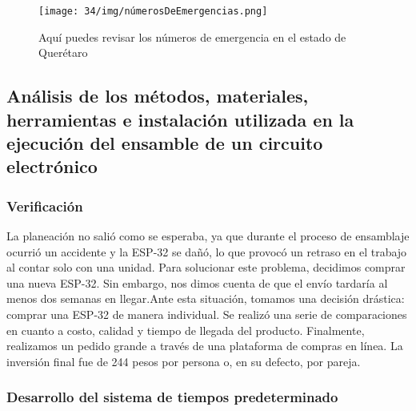     \begin{figure}[H]
        \centering
        \texttt{[image: 34/img/númerosDeEmergencias.png]}
        \caption{Aquí puedes revisar los números de emergencia en el estado de Querétaro}
        \label{fig:númerosDeEmergencias}
    \end{figure}
    
    \subsection{Análisis de los métodos, materiales, herramientas e instalación utilizada en la ejecución del ensamble de un circuito electrónico}
    
    \subsubsection{Verificación}
    
    La planeación no salió como se esperaba, ya que durante el proceso de ensamblaje ocurrió un accidente y la ESP-32 se dañó, lo que provocó un retraso en el trabajo al contar solo con una unidad. Para solucionar este problema, decidimos comprar una nueva ESP-32. Sin embargo, nos dimos cuenta de que el envío tardaría al menos dos semanas en llegar.Ante esta situación, tomamos una decisión drástica: comprar una ESP-32 de manera individual. Se realizó una serie de comparaciones en cuanto a costo, calidad y tiempo de llegada del producto. Finalmente, realizamos un pedido grande a través de una plataforma de compras en línea. La inversión final fue de 244 pesos por persona o, en su defecto, por pareja.
    \subsubsection{Desarrollo del sistema de tiempos predeterminado}
    
